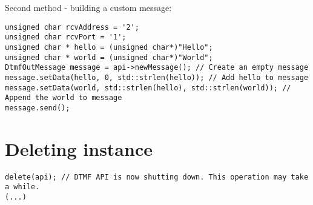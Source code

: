 Second method - building a custom message:
\begin{lstlisting}[float=htb,language={[ANSI]C++},caption={Sending data example 2},label=SendingDataEx2]
unsigned char rcvAddress = '2';
unsigned char rcvPort = '1';
unsigned char * hello = (unsigned char*)"Hello";
unsigned char * world = (unsigned char*)"World";
DtmfOutMessage message = api->newMessage(); // Create an empty message
message.setData(hello, 0, std::strlen(hello)); // Add hello to message
message.setData(world, std::strlen(hello), std::strlen(world)); // Append the world to message
message.send();
\end{lstlisting}


\section{Deleting instance}
\begin{lstlisting}[float=htb,language={[ANSI]C++},caption={Deleting instance example},label=DeletingInstanceEx]
delete(api); // DTMF API is now shutting down. This operation may take a while.
(...)
\end{lstlisting}